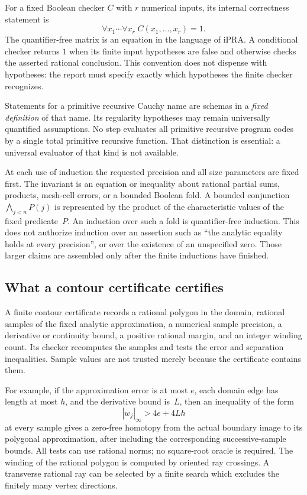 For a fixed Boolean checker $C$ with $r$ numerical inputs, its internal
correctness statement is
\[
         \forall x_1\cdots\forall x_r\;C(x_1,\ldots,x_r)=1.
\]
The quantifier-free matrix is an equation in the language of iPRA. A
conditional checker returns $1$ when its finite input hypotheses are false
and otherwise checks the asserted rational conclusion. This convention
does not dispense with hypotheses: the report must specify exactly which
hypotheses the finite checker recognizes.

Statements for a primitive recursive Cauchy name are schemas in a
\emph{fixed definition} of that name. Its regularity hypotheses may remain
universally quantified assumptions. No step evaluates all primitive
recursive program codes by a single total primitive recursive function.
That distinction is essential: a universal evaluator of that kind is not
available.

At each use of induction the requested precision and all size parameters
are fixed first. The invariant is an equation or inequality about rational
partial sums, products, mesh-cell errors, or a bounded Boolean fold. A
bounded conjunction $\bigwedge_{j<n}P(j)$ is represented by the product of
the characteristic values of the fixed predicate~$P$. An induction over
such a fold is quantifier-free induction. This does not authorize induction
over an assertion such as ``the analytic equality holds at every
precision'', or over the existence of an unspecified zero. Those larger
claims are assembled only after the finite inductions have finished.

\subsection{What a contour certificate certifies}
A finite contour certificate records a rational polygon in the domain,
rational samples of the fixed analytic approximation, a numerical sample
precision, a derivative or continuity bound, a positive rational margin,
and an integer winding count. Its checker recomputes the samples and tests
the error and separation inequalities. Sample values are not trusted
merely because the certificate contains them.

For example, if the approximation error is at most $e$, each domain edge
has length at most $h$, and the derivative bound is~$L$, then an inequality
of the form
\[
            |w_j|_\infty>4e+4Lh
\]
at every sample gives a zero-free homotopy from the actual boundary image
to its polygonal approximation, after including the corresponding
successive-sample bounds. All tests can use rational norms; no square-root
oracle is required. The winding of the rational polygon is computed by
oriented ray crossings. A transverse rational ray can be selected by a
finite search which excludes the finitely many vertex directions.


